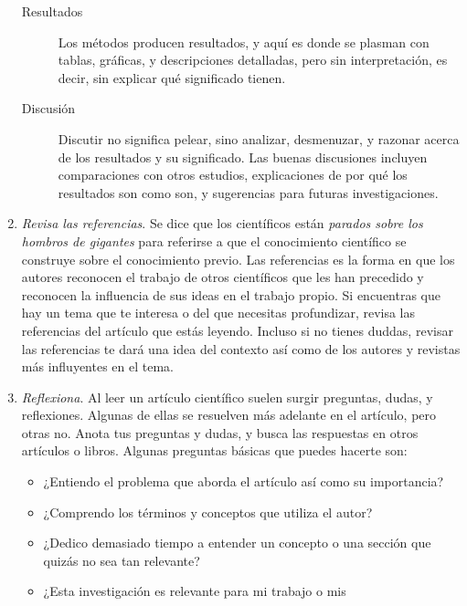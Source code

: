 \begin{enumerate}
\begin{description}
              \item[Resultados] Los métodos producen resultados, y aquí es donde
                  se plasman con tablas, gráficas, y descripciones detalladas,
                  pero sin interpretación, es decir, sin explicar qué
                  significado tienen.
              \item[Discusión] Discutir no significa pelear, sino analizar,
                  desmenuzar, y razonar acerca de los resultados y su
                  significado.
                  Las buenas discusiones incluyen comparaciones con otros
                  estudios, explicaciones de por qué los resultados son como
                  son, y sugerencias para futuras investigaciones.
          \end{description}
    \item \emph{Revisa las referencias}. Se dice que los científicos están
          \emph{parados sobre los hombros de gigantes} para referirse a que el
          conocimiento científico se construye sobre el conocimiento previo.
          Las referencias es la forma en que los autores reconocen el trabajo de
          otros científicos que les han precedido y reconocen la influencia de
          sus ideas en el trabajo propio.
          Si encuentras que hay un tema que te interesa o del que necesitas
          profundizar, revisa las referencias del artículo que estás leyendo.
          Incluso si no tienes duddas, revisar las referencias te dará una idea
          del contexto así como de los autores y revistas más influyentes en el
          tema.
    \item \emph{Reflexiona}. Al leer un artículo científico suelen surgir
          preguntas, dudas, y reflexiones.
          Algunas de ellas se resuelven más adelante en el artículo, pero otras
          no.
          Anota tus preguntas y dudas, y busca las respuestas en otros artículos
          o libros.
          Algunas preguntas básicas que puedes hacerte son:
          \begin{itemize}
              \item ¿Entiendo el problema que aborda el artículo así como su
                    importancia?
              \item ¿Comprendo los términos y conceptos que utiliza el autor?
              \item ¿Dedico demasiado tiempo a entender un concepto o una
                    sección que quizás no sea tan relevante?
              \item ¿Esta investigación es relevante para mi trabajo o mis

\end{itemize}
\end{enumerate}
